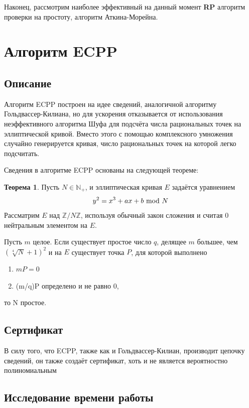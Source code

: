 \documentclass[12pt]{article}
\theoremstyle{definition}
\newtheorem{Th}{Теорема}
\numberwithin{Def}{section}
\numberwithin{Th}{section}
\numberwithin{St}{section}
\numberwithin{Cor}{section}
\begin{document}
Наконец, рассмотрим наиболее эффективный на данный момент \textbf{RP} алгоритм
проверки на простоту, алгоритм Аткина-Морейна.

\section{Алгоритм ECPP}

\subsection{Описание}

Алгоритм ECPP построен на идее сведений, аналогичной алгоритму
Гольдвассер-Килиана, но для ускорения отказывается от использования 
неэффективного алгоритма Шуфа для подсчёта числа рациональных точек на
эллиптической кривой. Вместо этого с помощью комплексного умножения
случайно генерируется кривая, число рациональных точек на которой легко 
подсчитать.

Сведения в алгоритме ECPP основаны на следующей теореме:

\begin{Th}
Пусть $N\in\mathbb{N}_+$, и эллиптическая кривая $E$ задаётся уравнением
$$
y^2=x^3+ax+b\ \mathrm{mod}\ N
$$
Рассматрим $E$ над $\mathbb{Z}/N\mathbb{Z}$, используя обычный закон сложения
и считая $0$ нейтральным элементом на $E$.

Пусть $m$ целое. Если существует простое число $q$, делящее $m$ большее, чем
${\left(\sqrt[4]{N}+1\right)^2}$ и на $E$ существует точка $P$,
для которой выполнено
\begin{enumerate}[(1)]
	\item $mP=0$
	\item (m/q)P определено и не равно $0$,
\end{enumerate}
то N простое.
\end{Th}

\subsection{Сертификат}

В силу того, что ECPP, также как и Гольдвассер-Килиан, производит цепочку
сведений, он также создаёт сертификат, хоть и не является вероятностно
полиномиальным

\subsection{Исследование времени работы}
\end{document}
